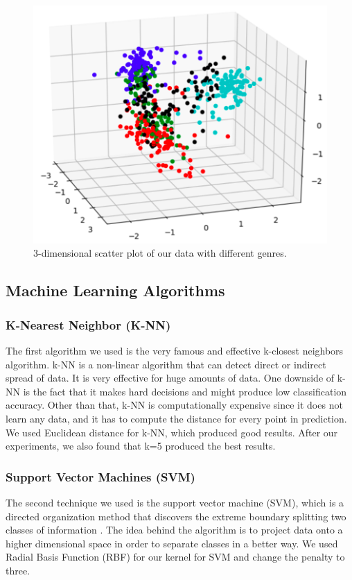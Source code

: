 \begin{figure}
\begin{center}
\includegraphics[scale=0.3]{./figures/3_d_plot.png}
\end{center}
\caption
{
3-dimensional scatter plot of our data with different genres. 
}
\label{fig:big_picture5}
\end{figure}

\subsection{Machine Learning Algorithms}
\subsubsection{\textbf{K-Nearest Neighbor (K-NN)}}
The first algorithm we used is the very famous and effective k-closest neighbors algorithm. k-NN is a non-linear algorithm that can detect direct or indirect spread of data. It is very effective for huge amounts of data. One downside of k-NN is the fact that it makes hard decisions and might produce low classification accuracy. Other than that, k-NN is computationally expensive since it does not learn any data, and it has to compute the distance for every point in prediction. We used Euclidean distance for k-NN, which produced good results. After our experiments, we also found that k=5 produced the best results. 

\subsubsection{\textbf{Support Vector Machines (SVM)}}
The second technique we used is the support vector machine (SVM), which is a directed organization method that discovers the extreme boundary splitting two classes of information \cite{SVM:2006}. The idea behind the algorithm is to project data onto a higher dimensional space in order to separate classes in a better way. We used Radial Basis Function (RBF) for our kernel for SVM and change the penalty to three. 

